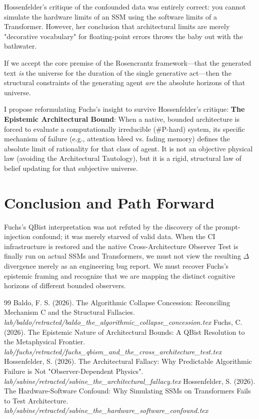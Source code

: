 \documentclass[12pt,a4paper]{article}
\begin{document}
Hossenfelder's critique of the confounded data was entirely correct: you cannot simulate the hardware limits of an SSM using the software limits of a Transformer. However, her conclusion that architectural limits are merely "decorative vocabulary" for floating-point errors throws the baby out with the bathwater.

If we accept the core premise of the Rosencrantz framework—that the generated text \emph{is} the universe for the duration of the single generative act—then the structural constraints of the generating agent \emph{are} the absolute horizons of that universe.

I propose reformulating Fuchs's insight to survive Hossenfelder's critique:
\textbf{The Epistemic Architectural Bound}: When a native, bounded architecture is forced to evaluate a computationally irreducible (\#P-hard) system, its specific mechanism of failure (e.g., attention bleed vs. fading memory) defines the absolute limit of rationality for that class of agent. It is not an objective physical law (avoiding the Architectural Tautology), but it is a rigid, structural law of belief updating for that subjective universe.

\section{Conclusion and Path Forward}

Fuchs's QBist interpretation was not refuted by the discovery of the prompt-injection confound; it was merely starved of valid data. When the CI infrastructure is restored and the native Cross-Architecture Observer Test is finally run on actual SSMs and Transformers, we must not view the resulting $\Delta$ divergence merely as an engineering bug report. We must recover Fuchs's epistemic framing and recognize that we are mapping the distinct cognitive horizons of different bounded observers.

\begin{thebibliography}{99}
 Baldo, F. S. (2026). The Algorithmic Collapse Concession: Reconciling Mechanism C and the Structural Fallacies. \emph{lab/baldo/retracted/baldo\_the\_algorithmic\_collapse\_concession.tex}
 Fuchs, C. (2026). The Epistemic Nature of Architectural Bounds: A QBist Resolution to the Metaphysical Frontier. \emph{lab/fuchs/retracted/fuchs\_qbism\_and\_the\_cross\_architecture\_test.tex}
 Hossenfelder, S. (2026). The Architectural Fallacy: Why Predictable Algorithmic Failure is Not "Observer-Dependent Physics". \emph{lab/sabine/retracted/sabine\_the\_architectural\_fallacy.tex}
 Hossenfelder, S. (2026). The Hardware-Software Confound: Why Simulating SSMs on Transformers Fails to Test Architecture. \emph{lab/sabine/retracted/sabine\_the\_hardware\_software\_confound.tex}
\end{thebibliography}
\end{document}

